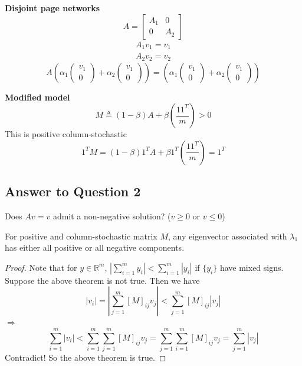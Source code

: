 \begin{multicols}{2}
\textbf{Disjoint page networks}
\[
    A = \begin{bmatrix}
        A_1 & 0 \\ 0 & A_2
    \end{bmatrix}
\]
\[
    \begin{array}{l}
        A_1 v_1 = v_1 \\ A_2 v_2 = v_2
    \end{array}
\]
\[
    A
    \left( \alpha_1 \left(\begin{array}{c} v_1 \\ 0 \end{array}\right) + \alpha_2 \left(\begin{array}{c} v_1 \\ 0 \end{array}\right) \right) 
    = 
    \left( \alpha_1 \left(\begin{array}{c} v_1 \\ 0 \end{array}\right) + \alpha_2 \left(\begin{array}{c} v_1 \\ 0 \end{array}\right) \right) 
\]

\textbf{Modified model}
\[
    M \triangleq (1-\beta) A + \beta \left( \frac{11^T}{m} \right) > 0
\]
This is positive column-stochastic
\[
    1^TM = (1-\beta)1^TA + \beta 1^T \left( \frac{11^T}{m} \right) = 1^T
\]

\subsection{Answer to Question 2}
Does $Av=v$ admit a non-negative solution? ($v\geq 0$ or $v\leq 0$)

\begin{theorem}
    For positive and column-stochastic matrix $M$, any eigenvector associated with $\lambda_1$ has either all positive or all negative components.
\end{theorem}
\begin{proof}
    Note that for $y\in\mathbb{R}^m$, $|\sum_{i=1}^m y_i| < \sum_{i=1}^m |y_i|$ if $\{y_i\}$ have mixed signs. \\
    Suppose the above theorem is not true. Then we have
    \[
        |v_i| = |\sum_{j=1}^m [M]_{ij}v_j| < \sum_{j=1}^m [M]_{ij}|v_j|
    \]
    $\Longrightarrow$
    \[
        \sum_{i=1}^m |v_i| < \sum_{i=1}^m \sum_{j=1}^m [M]_{ij}v_j = \sum_{j=1}^m\sum_{i=1}^m  [M]_{ij}v_j = \sum_{j=1}^m |v_j|
    \]
    Contradict! So the above theorem is true.
\end{proof}


\newpage
\end{multicols}